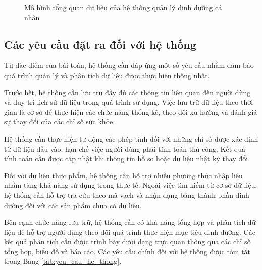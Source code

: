 \documentclass[12pt, a4paper]{report}
\begin{document}
\begin{figure}[htbp]
{
    }
    \caption{Mô hình tổng quan dữ liệu của hệ thống quản lý dinh dưỡng cá nhân}
    \label{fig:tong_quan_bai_toan}
\end{figure}

\subsection{Các yêu cầu đặt ra đối với hệ thống}Từ đặc điểm của bài toán, hệ thống cần đáp ứng một số yêu cầu nhằm đảm bảo quá trình quản lý và phân tích dữ liệu được thực hiện thống nhất.

Trước hết, hệ thống cần lưu trữ đầy đủ các thông tin liên quan đến người dùng và duy trì lịch sử dữ liệu trong quá trình sử dụng. Việc lưu trữ dữ liệu theo thời gian là cơ sở để thực hiện các chức năng thống kê, theo dõi xu hướng và đánh giá sự thay đổi của các chỉ số sức khỏe.

Hệ thống cần thực hiện tự động các phép tính đối với những chỉ số được xác định từ dữ liệu đầu vào, hạn chế việc người dùng phải tính toán thủ công. Kết quả tính toán cần được cập nhật khi thông tin hồ sơ hoặc dữ liệu nhật ký thay đổi.

Đối với dữ liệu thực phẩm, hệ thống cần hỗ trợ nhiều phương thức nhập liệu nhằm tăng khả năng sử dụng trong thực tế. Ngoài việc tìm kiếm từ cơ sở dữ liệu, hệ thống cần hỗ trợ tra cứu theo mã vạch và nhận dạng bảng thành phần dinh dưỡng đối với các sản phẩm chưa có dữ liệu.

Bên cạnh chức năng lưu trữ, hệ thống cần có khả năng tổng hợp và phân tích dữ liệu để hỗ trợ người dùng theo dõi quá trình thực hiện mục tiêu dinh dưỡng. Các kết quả phân tích cần được trình bày dưới dạng trực quan thông qua các chỉ số tổng hợp, biểu đồ và báo cáo. Các yêu cầu chính đối với hệ thống được tóm tắt trong Bảng \ref{tab:yeu_cau_he_thong}.
\end{document}
